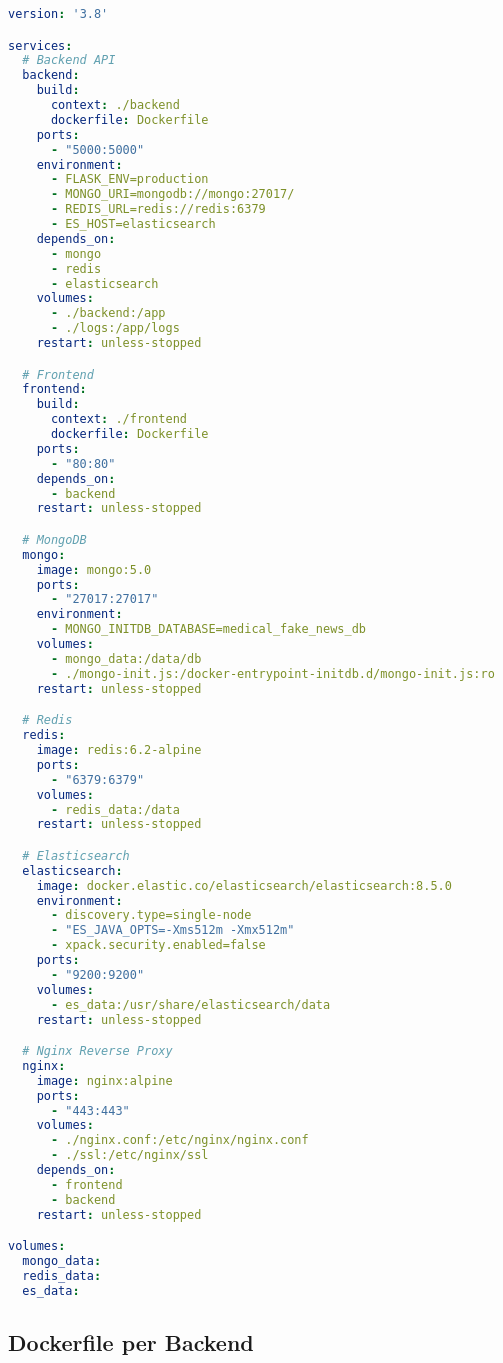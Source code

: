 \documentclass[12pt,a4paper]{report}
\begin{document}
\begin{lstlisting}[language=yaml, caption=docker-compose.yml]
version: '3.8'

services:
  # Backend API
  backend:
    build:
      context: ./backend
      dockerfile: Dockerfile
    ports:
      - "5000:5000"
    environment:
      - FLASK_ENV=production
      - MONGO_URI=mongodb://mongo:27017/
      - REDIS_URL=redis://redis:6379
      - ES_HOST=elasticsearch
    depends_on:
      - mongo
      - redis
      - elasticsearch
    volumes:
      - ./backend:/app
      - ./logs:/app/logs
    restart: unless-stopped

  # Frontend
  frontend:
    build:
      context: ./frontend
      dockerfile: Dockerfile
    ports:
      - "80:80"
    depends_on:
      - backend
    restart: unless-stopped

  # MongoDB
  mongo:
    image: mongo:5.0
    ports:
      - "27017:27017"
    environment:
      - MONGO_INITDB_DATABASE=medical_fake_news_db
    volumes:
      - mongo_data:/data/db
      - ./mongo-init.js:/docker-entrypoint-initdb.d/mongo-init.js:ro
    restart: unless-stopped

  # Redis
  redis:
    image: redis:6.2-alpine
    ports:
      - "6379:6379"
    volumes:
      - redis_data:/data
    restart: unless-stopped

  # Elasticsearch
  elasticsearch:
    image: docker.elastic.co/elasticsearch/elasticsearch:8.5.0
    environment:
      - discovery.type=single-node
      - "ES_JAVA_OPTS=-Xms512m -Xmx512m"
      - xpack.security.enabled=false
    ports:
      - "9200:9200"
    volumes:
      - es_data:/usr/share/elasticsearch/data
    restart: unless-stopped

  # Nginx Reverse Proxy
  nginx:
    image: nginx:alpine
    ports:
      - "443:443"
    volumes:
      - ./nginx.conf:/etc/nginx/nginx.conf
      - ./ssl:/etc/nginx/ssl
    depends_on:
      - frontend
      - backend
    restart: unless-stopped

volumes:
  mongo_data:
  redis_data:
  es_data:
\end{lstlisting}

\subsection{Dockerfile per Backend}
\end{document}

